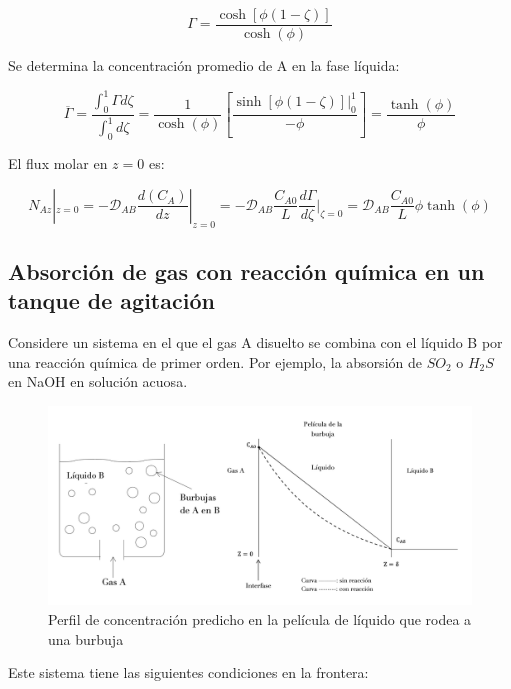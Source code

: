  \begin{equation}
  \Gamma=\frac{\cosh[{\phi(1-\zeta)}]}{\cosh({\phi})}   
 \end{equation}

 Se determina la concentración promedio de A en la fase líquida:

 \begin{equation}
     \overline{\Gamma}=\frac{\int_0^1\Gamma d\zeta}{\int_0^1d\zeta}=\frac{1}{\cosh(\phi)}[\frac{\sinh[\phi(1-\zeta)]|_{0}^1}{-\phi}]=\frac{\tanh(\phi)}{\phi}
 \end{equation}
 
El flux molar en $z=0$ es:

\begin{equation}
    N_{Az}|_{z=0}=-\mathscr{D}_{AB}\frac{d(C_A)}{dz}|_{z=0}=-\mathscr{D}_{AB}\frac{C_{A0}}{L}\frac{d\Gamma}{d\zeta}|_{\zeta=0}=\mathscr{D}_{AB}\frac{C_{A0}}{L}\phi\tanh(\phi)
\end{equation}



\subsection{Absorción de gas con reacción química en un tanque de agitación}
Considere un sistema en el que el gas A disuelto se combina con el líquido B por una reacción química de primer orden. Por ejemplo, la absorsión de $SO_2$ o $H_2S$ en NaOH en solución acuosa.

\begin{figure}[H]
    \centering
    \includegraphics[width=\linewidth]{Capitulo2/Imagenes/Fig_2.10.png}
    \caption{Perfil de concentración predicho en la película de líquido que rodea a una burbuja}
\end{figure}

Este sistema tiene las siguientes condiciones en la frontera:

